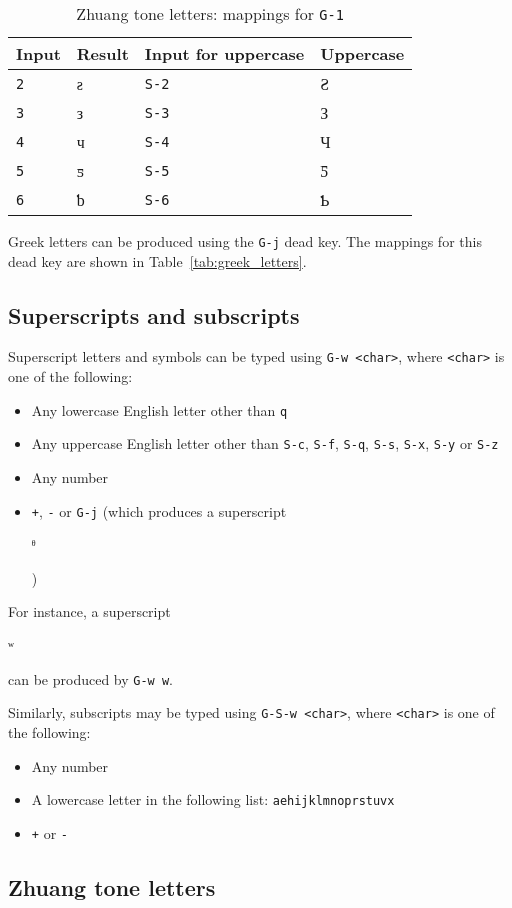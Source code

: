 \documentclass[oneside]{memoir}
\newcommand{\key}{\verb}
\newcommand{\keynv}{\texttt}
\newcommand{\out}[1]{\colorbox{gray!20}{\strut{}#1}}
\begin{document}
\begin{table}[b]
\centering
\caption{Zhuang tone letters: mappings for \keynv{G-1}}
\label{tab:zhuang_tones}
\centering
\begin{tabular}{llll}
\toprule
Input & Result & Input for uppercase & Uppercase \\
\midrule
\key|2| & ƨ & \key|S-2| & Ƨ \\
\key|3| & з & \key|S-3| & З \\
\key|4| & ч & \key|S-4| & Ч \\
\key|5| & ƽ & \key|S-5| & Ƽ \\
\key|6| & ƅ & \key|S-6| & Ƅ \\
\bottomrule
\end{tabular}
\end{table}

Greek letters can be produced using the \key|G-j| dead key.
The mappings for this dead key are shown in Table~\ref{tab:greek_letters}.

\subsection{Superscripts and subscripts}
\label{sec:superscripts-subscripts}

Superscript letters and symbols can be typed using \key|G-w <char>|, where \key|<char>| is one of the following:
\begin{itemize}[noitemsep]
\item Any lowercase English letter other than \key|q|
\item Any uppercase English letter other than \key|S-c|, \key|S-f|, \key|S-q|, \key|S-s|, \key|S-x|, \key|S-y| or \key|S-z|
\item Any number
\item \key|+|, \key|-| or \key|G-j| (which produces a superscript \out{ᶿ})
\end{itemize}
For instance, a superscript \out{ʷ} can be produced by \key|G-w w|.

Similarly, subscripts may be typed using \key|G-S-w <char>|, where \key|<char>| is one of the following:
\begin{itemize}[noitemsep]
\item Any number
\item A lowercase letter in the following list: \texttt{aehijklmnoprstuvx}
\item \key|+| or \key|-|
\end{itemize}

\subsection{Zhuang tone letters}
\label{sec:zhuang_tones}
\end{document}
